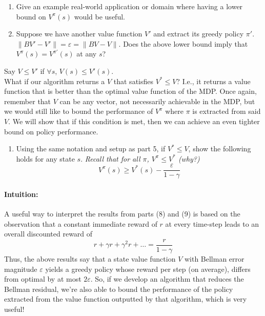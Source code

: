 \documentclass[12pt]{article}
\begin{document}
{{\begin{enumerate}[resume*]
    \[
    V^{\pi}(s) \geq V^{\ast}(s) - \frac{2\varepsilon}{1 - \gamma}
    \]
    
    \item Give an example real-world application or domain where having a lower bound on $V^{\pi}(s)$ would be useful. 
    
    \item Suppose we have another value function $V'$ and extract its greedy policy $\pi'$. $\|BV' - V'\| = \varepsilon = \|BV - V\|$. Does the above lower bound imply that $V^{\pi}(s) = V^{\pi'}(s)$ at any $s$? 
 \end{enumerate}
    Say $V \leq V'$ if $\forall s$, $V(s) \leq V'(s)$.
\\
What if our algorithm returns a $V$ that satisfies $V^* \leq V$? I.e., it returns a value function that is better than the optimal value function of the MDP. Once again, remember that $V$ can be any vector, not necessarily achievable in the MDP, but we would still like to bound the performance of $V^{\pi}$ where $\pi$ is extracted from said $V$. We will show that if this condition is met, then we can achieve an even tighter bound on policy performance.
\begin{enumerate}[resume*]
    \item Using the same notation and setup as part 5, if $V^{\ast} \leq V$, show the following holds for any state $s$. \textit{Recall that for all $\pi$, $V^{\pi} \leq V^{\ast}$ (why?)} 
    \[
    V^{\pi}(s) \geq V^{\ast}(s) - \frac{\varepsilon}{1 - \gamma}
    \]
\end{enumerate}

\paragraph{Intuition:} A useful way to interpret the results from parts (8) and (9) is based on the observation that a constant immediate reward of $r$ at every time-step leads to an overall discounted reward of 
\[
r + \gamma r + \gamma^2 r + \dots = \frac{r}{1 - \gamma}
\]
Thus, the above results say that a state value function $V$ with Bellman error magnitude $\varepsilon$ yields a greedy policy whose reward per step (on average), differs from optimal by at most $2\varepsilon$. So, if we develop an algorithm that reduces the Bellman residual, we’re also able to bound the performance of the policy extracted from the value function outputted by that algorithm, which is very useful!

}}
\end{document}
